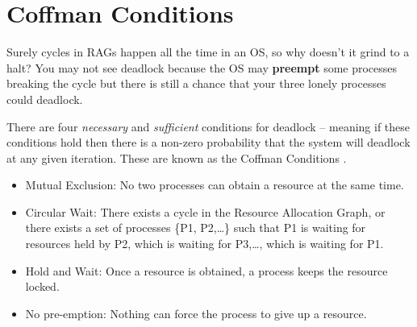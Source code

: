 \section{Coffman Conditions}

Surely cycles in RAGs happen all the time in an OS, so why doesn't it grind to a halt?
You may not see deadlock because the OS may \textbf{preempt} some processes breaking the cycle but there is still a chance that your three lonely processes could deadlock.

There are four \emph{necessary} and \emph{sufficient} conditions for deadlock -- meaning if these conditions hold then there is a non-zero probability that the system will deadlock at any given iteration.
These are known as the \gls{Coffman Conditions} \cite{coffman1971system}.

\begin{itemize}
	\tightlist
	\item
	      \gls{Mutual Exclusion}: No two processes can obtain a resource at the same time.
	\item
	      \gls{Circular Wait}: There exists a cycle in the Resource Allocation Graph, or there exists a set of processes \{P1, P2,\ldots{}\} such that P1 is waiting for resources held by P2, which is waiting for P3,\ldots{}, which is waiting for P1.
	\item
	      \gls{Hold and Wait}: Once a resource is obtained, a process keeps the resource locked.
	\item
	      No \gls{pre-emption}: Nothing can force the process to give up a resource.
\end{itemize}

